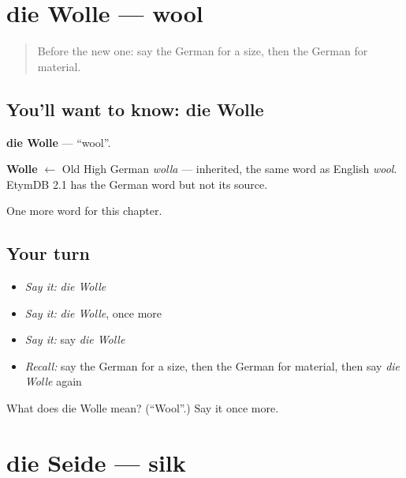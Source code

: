 \section[die Wolle]{die Wolle — wool}

\label{lesson:GE-C203-wolle}



\begin{quote}
Before the new one: say the German for a size, then the German for material.
\end{quote}

\subsection*{You'll want to know: die Wolle}
\textbf{die Wolle} — \textquotedblleft{}wool\textquotedblright{}.

\begin{cousinweb}
\textbf{Wolle} $\leftarrow$ Old High German \emph{wolla} — inherited, the same word as English \emph{wool}. EtymDB 2.1 has the German word but not its source.
\end{cousinweb}

\begin{grammarlens}[title={What you've built}]
One more word for this chapter.
\end{grammarlens}

\subsection*{Your turn}
\begin{itemize}
\raggedright
  \item \emph{Say it:} \emph{die Wolle}
  \item \emph{Say it:} \emph{die Wolle}, once more
  \item \emph{Say it:} say \emph{die Wolle}
  \item \emph{Recall:} say the German for a size, then the German for material, then say \emph{die Wolle} again
\end{itemize}

\begin{tcolorbox}[breakable,colback=teal!4,colframe=teal!35!black,title={Before you move on}]
What does die Wolle mean? (\textquotedblleft{}Wool\textquotedblright{}.) Say it once more.
\end{tcolorbox}
\section[die Seide]{die Seide — silk}

